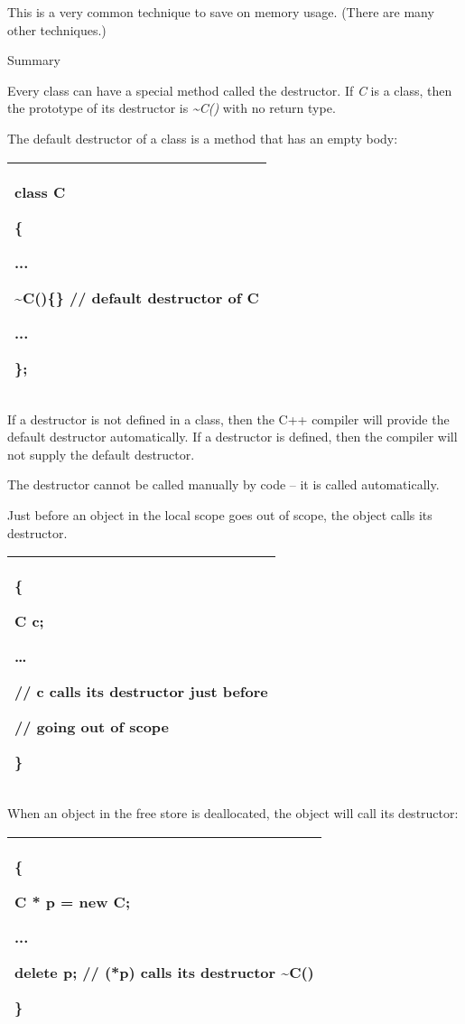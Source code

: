 \documentclass[
]{article}
\begin{document}
This is a very common technique to save on memory usage. (There are many
other techniques.)

Summary

Every class can have a special method called the destructor. If \emph{C}
is a class, then the prototype of its destructor is
\emph{\textasciitilde C()} with no return type.

The default destructor of a class is a method that has an empty body:

\begin{longtable}[]{@{}l@{}}
\toprule
\endhead
\begin{minipage}[t]{0.97\columnwidth}\raggedright
class C

\{

...

\textasciitilde C()\{\} // default destructor of C

...

\};\strut
\end{minipage}\tabularnewline
\bottomrule
\end{longtable}

If a destructor is not defined in a class, then the C++ compiler will
provide the default destructor automatically. If a destructor is
defined, then the compiler will not supply the default destructor.

The destructor cannot be called manually by code -- it is called
automatically.

Just before an object in the local scope goes out of scope, the object
calls its destructor.

\begin{longtable}[]{@{}l@{}}
\toprule
\endhead
\begin{minipage}[t]{0.97\columnwidth}\raggedright
\{

C c;

\ldots{}

// c calls its destructor just before

// going out of scope

\}\strut
\end{minipage}\tabularnewline
\bottomrule
\end{longtable}

When an object in the free store is deallocated, the object will call
its destructor:

\begin{longtable}[]{@{}l@{}}
\toprule
\endhead
\begin{minipage}[t]{0.97\columnwidth}\raggedright
\{

C * p = new C;

...

delete p; // (*p) calls its destructor \textasciitilde C()

\}\strut
\end{minipage}\tabularnewline
\bottomrule
\end{longtable}
\end{document}
